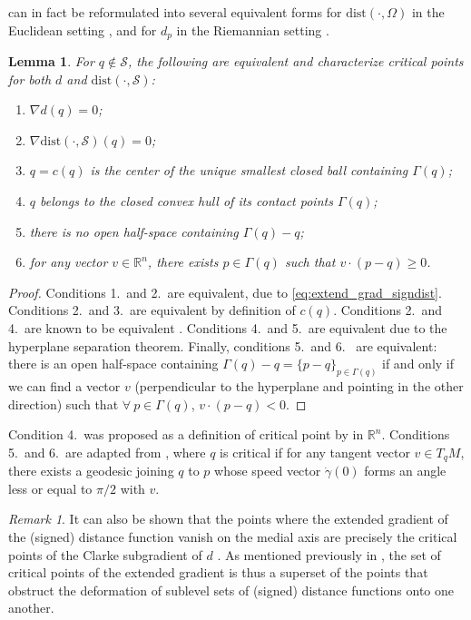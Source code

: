 \documentclass[11pt]{article}
\newcommand{\R}{\mathbb{R}}
\newcommand{\W}{\Omega}
\newcommand{\dist}{\mathrm{dist}}
\newcommand{\Surf}{\mathcal{S}}
\newcommand{\grad}{\nabla}
\theoremstyle{plain}
\newtheorem{lem}{Lemma}
\theoremstyle{definition}
\theoremstyle{remark}
\newtheorem{rmk}{Remark}
\begin{document}
	 can in fact be reformulated into several equivalent forms for $\dist(\cdot, \W)$ in the Euclidean setting \citep{lieutier_any_2003,chazal_stability_2007}, and for $d_p$ in the Riemannian setting \citep{grove_generalized_1977, cheeger_critical_1991}.
	
	\begin{lem}
		\label{lem:equivalent_definitions_critical_point}
		For $q \notin \Surf$, the following are equivalent and characterize critical points for both $d$ and $\dist(\cdot, \Surf)$:
		\begin{enumerate}
			\item $\grad d(q) = 0$;
			\item $\grad \dist(\cdot, \Surf)(q) = 0$;
			\item $q = c(q)$ is the center of the unique smallest closed ball
			containing $\Gamma(q)$;
			\item $q$ belongs to the closed convex hull of its contact points $\Gamma(q)$;
			\item there is no open half-space containing $\Gamma(q)-q$;
			\item for any vector $v \in \R^n$, there exists $p \in \Gamma(q)$ such that 
			$v \cdot (p-q) \geq 0$.
		\end{enumerate}
	\end{lem}
	\begin{proof}
		Conditions 1.~and 2.~are equivalent, due to \cref{eq:extend_grad_signdist}. Conditions 2.~and 3.~are equivalent by definition of $c(q)$.
		Conditions 2.~and 4.~are known to be equivalent \cite[Lemma 2.2]{chazal_stability_2007}. 
		Conditions 4.~and 5.~are equivalent due to the hyperplane separation theorem.
		Finally, conditions 5.~and 6.~ are equivalent: 
		there is an open half-space containing $\Gamma(q) - q = \{p - q\}_{p \in \Gamma(q)}$ if and only if we can find a vector $v$ (perpendicular to the hyperplane and pointing in the other direction) such that $\forall\ p \in \Gamma(q)$, $v \cdot (p-q) < 0$.
	\end{proof}
	Condition 4.~was proposed as a definition of critical point by \cite{ferry_when_1976} in $\R^n$.
	Conditions 5.~and 6.~are adapted from \cite{grove_generalized_1977,cheeger_critical_1991}, where $q$ is critical if for any tangent vector $v \in T_q M$, there exists a geodesic joining $q$ to $p$ whose speed vector $\dot\gamma(0)$ forms an angle less or equal to $\pi / 2$ with $v$.
	
	\begin{rmk}
		It can also be shown that the points where the extended gradient of the (signed) distance function vanish on the medial axis are precisely the critical points of the Clarke subgradient of $d$ \citep{clarke1990optimization}. As mentioned previously in , the set of critical points of the extended gradient is thus a superset of the points that obstruct the deformation of sublevel sets of (signed) distance functions onto one another. 
	\end{rmk}
	
\end{document}
